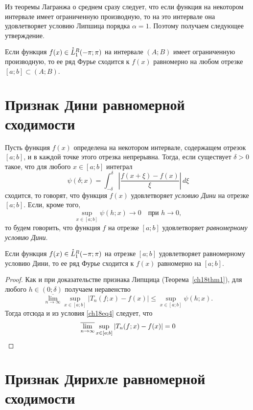 Из теоремы Лагранжа о среднем сразу следует, что если функция на некотором интервале имеет ограниченную производную, то на это интервале она удовлетворяет условию Липшица порядка $\alpha = 1$. Поэтому получаем следующее утверждение.
\begin{cons}
Если функция $f(x) \in \accentset{*}{L}^{R}_1(-\pi;\pi)$ на интервале $(A;B)$ имеет ограниченную производную, то ее ряд Фурье сходится к $f(x)$ равномерно на любом отрезке $[a;b] \subset (A;B)$.
\end{cons}

\section{Признак Дини равномерной сходимости}
Пусть функция $f(x)$ определена на некотором интервале, содержащем отрезок $[a;b]$, и в каждой точке этого отрезка непрерывна. Тогда, если существует $\delta > 0$ такое, что для любого $x \in [a;b]$ интеграл
$$
\psi(\delta ; x) = \int_{-\delta}^{\delta} \left|\frac{f(x + \xi) - f(x)}{\xi}\right|\, d\xi
$$
сходится, то говорят, что функция $f(x)$ удовлетворяет \textit{условию Дини} на отрезке $[a;b]$. Если, кроме того,
\begin{equation} \label{ch18eq4}
\sup\limits_{x \in [a;b]} \psi(h;x) \to 0 \quad \text{при } h \to 0 ,
\end{equation}
то будем говорить, что функция $f$ на отрезке $[a;b]$ удовлетворяет \textit{равномерному условию Дини}.

\begin{thm}  \label{ch18thm2}
Если функция $f(x) \in \accentset{*}{L}^{R}_1(-\pi;\pi)$ на отрезке $[a;b]$ удовлетворяет равномерному условию Дини, то ее ряд Фурье сходится к $f(x)$ равномерно на $[a;b]$.
\end{thm}
\begin{proof}
Как и при доказательстве признака Липщица (Теорема~\ref{ch18thm1}), для любого $h \in (0;\delta)$ получаем неравенство
$$
\overline{\lim\limits_{n \to \infty}} \sup \limits_{x \in [a;b]} |T_n(f; x) - f(x)| \le \sup\limits_{x \in [a;b]} \psi(h;x).
$$
Тогда отсюда и из условия \eqref{ch18eq4} следует, что
\begin{equation*}
\overline{\lim\limits_{n \to \infty}} \sup \limits_{x \in [a;b]} |T_n(f; x) - f(x)| = 0 \qedhere
\end{equation*}
\end{proof}

\section{Признак Дирихле равномерной сходимости}

